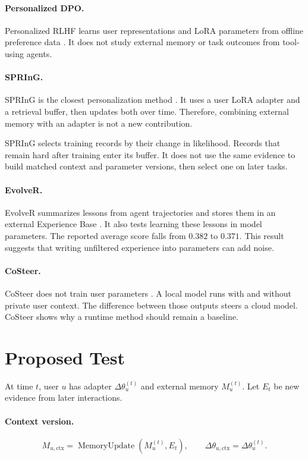 \documentclass[11pt]{article}
\newcommand{\adapter}{\Delta\theta_u}
\newcommand{\memory}{M_u}
\begin{document}
\paragraph{Personalized DPO.}
Personalized RLHF learns user representations and LoRA parameters from offline
preference data \cite{li2024prlhf}. It does not study external memory or task
outcomes from tool-using agents.

\paragraph{SPRInG.}
SPRInG is the closest personalization method \cite{kim2026spring}. It uses a
user LoRA adapter and a retrieval buffer, then updates both over time.
Therefore, combining external memory with an adapter is not a new
contribution.

SPRInG selects training records by their change in likelihood. Records that
remain hard after training enter its buffer. It does not use the same evidence
to build matched context and parameter versions, then select one on later
tasks.

\paragraph{EvolveR.}
EvolveR summarizes lessons from agent trajectories and stores them in an
external Experience Base \cite{wu2025evolver}. It also tests learning these
lessons in model parameters. The reported average score falls from \(0.382\)
to \(0.371\). This result suggests that writing unfiltered experience into
parameters can add noise.

\paragraph{CoSteer.}
CoSteer does not train user parameters \cite{lv2025costeer}. A local model
runs with and without private user context. The difference between those
outputs steers a cloud model. CoSteer shows why a runtime method should remain
a baseline.

\section{Proposed Test}

At time \(t\), user \(u\) has adapter \(\adapter^{(t)}\) and external memory
\(\memory^{(t)}\). Let \(E_t\) be new evidence from later interactions.

\paragraph{Context version.}
\begin{equation}
  M_{u,\mathrm{ctx}}
  =\operatorname{MemoryUpdate}\!\left(\memory^{(t)},E_t\right),
  \qquad
  \Delta\theta_{u,\mathrm{ctx}}=\adapter^{(t)}.
\end{equation}
\end{document}
